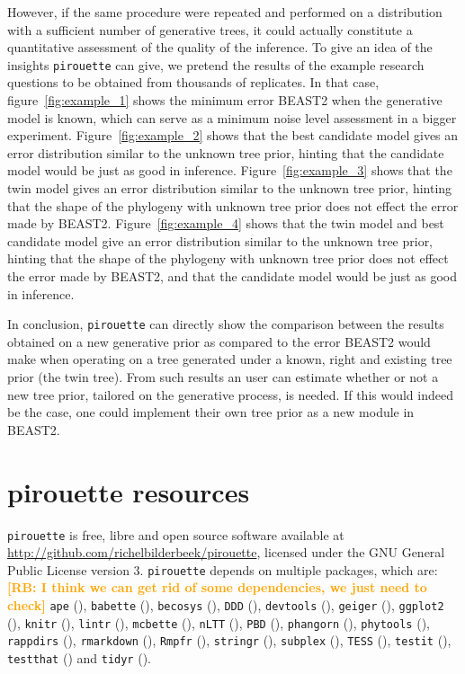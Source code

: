 \documentclass{article}
\newcommand{\richel}[1]{\textcolor{orange}{\textbf{[RB: #1]}}}
\begin{document}
However, if the same procedure were repeated and performed on a distribution 
with a sufficient number of generative trees, 
it could actually constitute a quantitative assessment 
of the quality of the inference.
To give an idea of the insights \verb;pirouette; can give,
we pretend the results of the example research questions
to be obtained from thousands of replicates.
In that case, figure~\ref{fig:example_1} shows 
the minimum error BEAST2 when the
generative model is known, which can serve as 
a minimum noise level assessment in a bigger experiment.  
Figure~\ref{fig:example_2} shows that 
the best candidate model gives an error distribution similar to the unknown 
tree prior,
hinting that the candidate model would be just as good in inference.
Figure~\ref{fig:example_3} shows that 
the twin model gives an error distribution similar to the unknown tree prior,
hinting that the shape of the phylogeny with unknown tree prior
does not effect the error made by BEAST2.
Figure~\ref{fig:example_4} shows that 
the twin model and best candidate model give 
an error distribution similar to the unknown tree prior,
hinting that the shape of the phylogeny with unknown tree prior
does not effect the error made by BEAST2, 
and that the candidate model would be just as good in inference.

In conclusion, \verb;pirouette; can directly show 
the comparison between the results obtained 
on a new generative prior as compared to the error BEAST2 
would make when operating on a tree generated 
under a known, right and existing tree prior (the twin tree).
From such results an user can estimate whether or not a new tree prior, 
tailored on the generative process, is needed. 
If this would indeed be the case, 
one could implement their own tree prior as a new module in BEAST2.

\section{pirouette resources}

\verb;pirouette; is free, libre and open source software available at 
\url{http://github.com/richelbilderbeek/pirouette},
licensed under the GNU General Public License version 3.
\verb;pirouette; depends on multiple packages, which are:
\richel{I think we can get rid of some dependencies, we just need to check}
\verb;ape; (\cite{APE}), 
\verb;babette; (\cite{bilderbeek2018babette}),
\verb;becosys; (\cite{becosys}),
\verb;DDD; (\cite{DDD}),
\verb;devtools; (\cite{devtools}),
\verb;geiger; (\cite{geiger}),
\verb;ggplot2; (\cite{ggplot2}),
\verb;knitr; (\cite{knitr}),
\verb;lintr; (\cite{lintr}),
\verb;mcbette; (\cite{mcbette}),
\verb;nLTT; (\cite{nLTT}),
\verb;PBD; (\cite{PBD}),
\verb;phangorn; (\cite{phangorn}),
\verb;phytools; (\cite{phytools}),
\verb;rappdirs; (\cite{rappdirs}),
\verb;rmarkdown; (\cite{rmarkdown}),
\verb;Rmpfr; (\cite{Rmpfr}),
\verb;stringr; (\cite{stringr}),
\verb;subplex; (\cite{subplex}),
\verb;TESS; (\cite{TESS}),
\verb;testit; (\cite{testit}), 
\verb;testthat; (\cite{testthat}) and
\verb;tidyr; (\cite{tidyr}).
\end{document}
